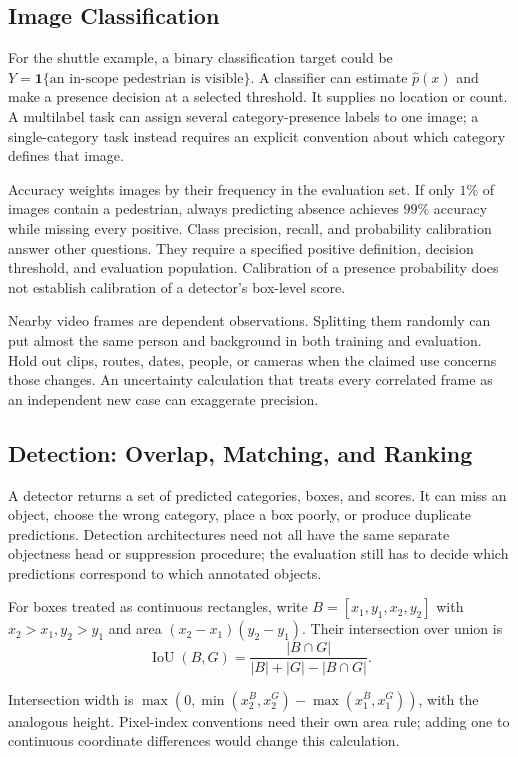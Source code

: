 \subsection{Image Classification}

For the shuttle example, a binary classification target could be $Y=\mathbf1\{\text{an in-scope pedestrian is visible}\}$. A classifier can estimate $\hat p(x)$ and make a presence decision at a selected threshold. It supplies no location or count. A multilabel task can assign several category-presence labels to one image; a single-category task instead requires an explicit convention about which category defines that image.

Accuracy weights images by their frequency in the evaluation set. If only $1\%$ of images contain a pedestrian, always predicting absence achieves $99\%$ accuracy while missing every positive. Class precision, recall, and probability calibration answer other questions. They require a specified positive definition, decision threshold, and evaluation population. Calibration of a presence probability does not establish calibration of a detector's box-level score.

Nearby video frames are dependent observations. Splitting them randomly can put almost the same person and background in both training and evaluation. Hold out clips, routes, dates, people, or cameras when the claimed use concerns those changes. An uncertainty calculation that treats every correlated frame as an independent new case can exaggerate precision.

\subsection{Detection: Overlap, Matching, and Ranking}

A detector returns a set of predicted categories, boxes, and scores. It can miss an object, choose the wrong category, place a box poorly, or produce duplicate predictions. Detection architectures need not all have the same separate objectness head or suppression procedure; the evaluation still has to decide which predictions correspond to which annotated objects.

\par\noindent\begin{minipage}{\linewidth}
For boxes treated as continuous rectangles, write $B=[x_1,y_1,x_2,y_2]$ with $x_2>x_1,y_2>y_1$ and area $(x_2-x_1)(y_2-y_1)$. Their intersection over union is
\[
\operatorname{IoU}(B,G)=\frac{|B\cap G|}{|B|+|G|-|B\cap G|}.
\]
\end{minipage}\par\addvspace{\belowdisplayskip}
Intersection width is $\max(0,\min(x_2^B,x_2^G)-\max(x_1^B,x_1^G))$, with the analogous height. Pixel-index conventions need their own area rule; adding one to continuous coordinate differences would change this calculation.

